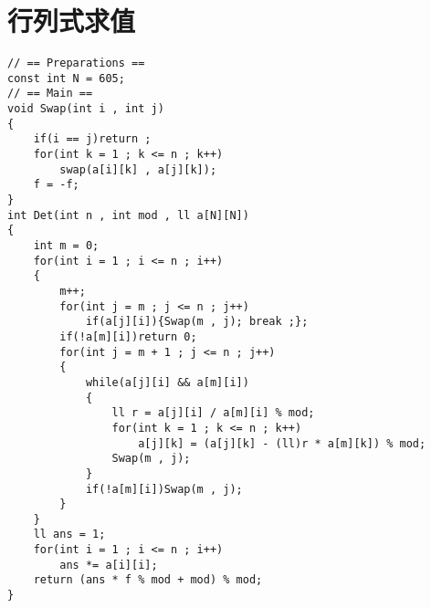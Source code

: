 \section{行列式求值}

\begin{verbatim}
// == Preparations ==
const int N = 605;
// == Main ==
void Swap(int i , int j)
{
    if(i == j)return ;
    for(int k = 1 ; k <= n ; k++)
        swap(a[i][k] , a[j][k]);
    f = -f;
}
int Det(int n , int mod , ll a[N][N])
{
    int m = 0;
    for(int i = 1 ; i <= n ; i++)
    {
        m++;
        for(int j = m ; j <= n ; j++)
            if(a[j][i]){Swap(m , j); break ;};
        if(!a[m][i])return 0;
        for(int j = m + 1 ; j <= n ; j++)
        {
            while(a[j][i] && a[m][i])
            {
                ll r = a[j][i] / a[m][i] % mod;
                for(int k = 1 ; k <= n ; k++)
                    a[j][k] = (a[j][k] - (ll)r * a[m][k]) % mod;
                Swap(m , j);
            }
            if(!a[m][i])Swap(m , j);
        }
    }
    ll ans = 1;
    for(int i = 1 ; i <= n ; i++)
        ans *= a[i][i];
    return (ans * f % mod + mod) % mod;
}
\end{verbatim}